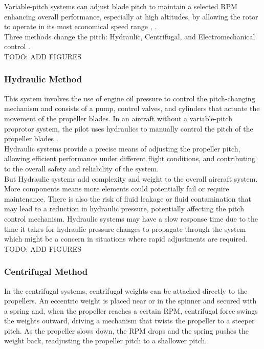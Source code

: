 Variable-pitch systems can adjust blade pitch to maintain a selected \gls{RPM} enhancing overall performance, especially at high altitudes, by allowing the rotor to operate in its most economical speed range \cite{VPP2}, \cite{VPP3}.\\

Three methods change the pitch: Hydraulic, Centrifugal, and Electromechanical control \cite{VPP2}.\\
TODO: ADD FIGURES

\subsubsection{Hydraulic Method}
This system involves the use of engine oil pressure to control the pitch-changing mechanism and consists of a pump, control valves, and cylinders that actuate the movement of the propeller blades.
In an aircraft without a variable-pitch proprotor system, the pilot uses hydraulics to manually control the pitch of the propeller blades \cite{VPP2}.\\

Hydraulic systems provide a precise means of adjusting the propeller pitch, allowing efficient performance under different flight conditions, and contributing to the overall safety and reliability of the system.\\

But Hydraulic systems add complexity and weight to the overall aircraft system. 
More components means more elements could potentially fail or require maintenance. 
There is also the risk of fluid leakage or fluid contamination that may lead to a reduction in hydraulic pressure, potentially affecting the pitch control mechanism.
Hydraulic systems may have a slow response time due to the time it takes for hydraulic pressure changes to propagate through the system which might be a concern in situations where rapid adjustments are required.\cite{VPP2}
TODO: ADD FIGURES

\subsubsection{Centrifugal Method}
In the centrifugal systems, centrifugal weights can be attached directly to the propellers.
An eccentric weight is placed near or in the spinner and secured with a spring and, when the propeller reaches a certain \gls{RPM}, centrifugal force swings the weights outward, driving a mechanism that twists the propeller to a steeper pitch. 
As the propeller slows down, the \gls{RPM} drops and the spring pushes the weight back, readjusting the propeller pitch to a shallower pitch.

